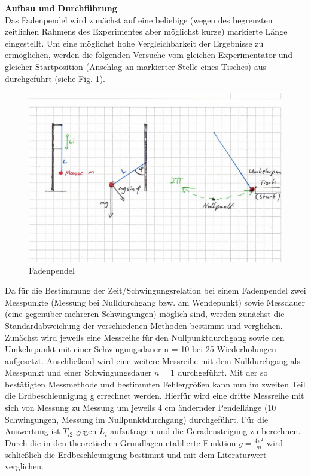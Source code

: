 \documentclass[11pt, a4paper]{article}
\begin{document}
\textbf{Aufbau und Durchführung}\\Das Fadenpendel wird zunächst auf eine beliebige (wegen des begrenzten zeitlichen Rahmens des Experimentes aber möglichst kurze) markierte Länge eingestellt. Um eine möglichst hohe Vergleichbarkeit der Ergebnisse zu ermöglichen, werden die folgenden Versuche vom gleichen Experimentator und gleicher Startposition (Anschlag an markierter Stelle eines Tisches) aus durchgeführt (siehe Fig. 1).

\begin{figure}[h]
\includegraphics[scale=0.3]{Fadenpendel.png}
\caption{Fadenpendel}
\end{figure}
Da für die Bestimmung der Zeit/Schwingungsrelation bei einem Fadenpendel zwei Messpunkte (Messung bei Nulldurchgang bzw. am Wendepunkt) sowie Messdauer (eine gegenüber mehreren Schwingungen) möglich sind, werden zunächst die Standardabweichung der verschiedenen Methoden bestimmt und verglichen. Zunächst wird jeweils eine Messreihe für den Nullpunktdurchgang sowie den Umkehrpunkt mit einer Schwingungsdauer n = 10 bei 25 Wiederholungen aufgesetzt. Anschließend wird eine weitere Messreihe mit dem Nulldurchgang als Messpunkt und einer Schwingungsdauer $n=1$ durchgeführt. Mit der so bestätigten Messmethode und bestimmten Fehlergrößen kann nun im zweiten Teil die Erdbeschleunigung g errechnet werden. Hierfür wird eine dritte Messreihe mit sich von Messung  zu Messung um jeweils 4 cm ändernder Pendellänge (10 Schwingungen, Messung im Nullpunktdurchgang) durchgeführt. Für die Auswertung ist $T_{i2}$ gegen $L_i$ aufzutragen und die Geradensteigung zu berechnen. Durch die in den theoretischen Grundlagen etablierte Funktion $g = \frac{4\pi^2}{m}$ wird schließlich die Erdbeschleunigung bestimmt und mit dem Literaturwert verglichen.
\end{document}
